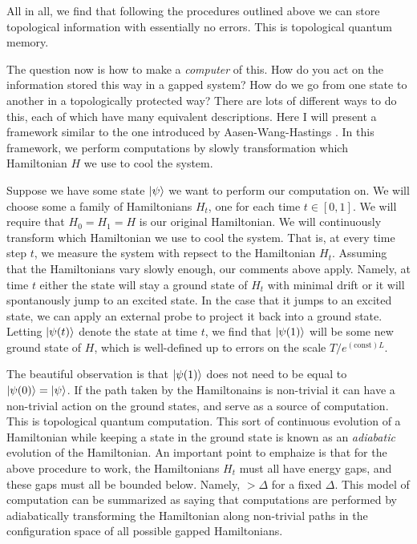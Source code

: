 All in all, we find that following the procedures outlined above we can store topological information with essentially no errors. This is topological quantum memory.

The question now is how to make a \textit{computer} of this. How do you act on the information stored this way in a gapped system? How do we go from one state to another in a topologically protected way? There are lots of different ways to do this, each of which have many equivalent descriptions. Here I will present a framework similar to the one introduced by Aasen-Wang-Hastings \cite{aasen2022adiabatic}. In this framework, we perform computations by slowly transformation which Hamiltonian $H$ we use to cool the system.

Suppose we have some state $\ket{\psi}$ we want to perform our computation on. We will choose some a family of Hamiltonians $H_t$, one for each time $t\in [0,1]$. We will require that $H_0=H_1=H$ is our original Hamiltonian. We will continuously transform which Hamiltonian we use to cool the system. That is, at every time step $t$, we measure the system with repsect to the Hamiltonian $H_t$. Assuming that the Hamiltonians vary slowly enough, our comments above apply. Namely, at time $t$ either the state will stay a ground state of $H_t$ with minimal drift or it will spontanously jump to an excited state. In the case that it jumps to an excited state, we can apply an external probe to project it back into a ground state. Letting $\ket{\psi(t)}$ denote the state at time $t$, we find that $\ket{\psi(1)}$ will be some new ground state of $H$, which is well-defined up to errors on the scale $T/e^{(\text{const})L}$.

The beautiful observation is that $\ket{\psi(1)}$ does not need to be equal to $\ket{\psi(0)}=\ket{\psi}$. If the path taken by the Hamiltonains is non-trivial it can have a non-trivial action on the ground states, and serve as a source of computation. This is topological quantum computation. This sort of continuous evolution of a Hamiltonian while keeping a state in the ground state is known as an \textit{adiabatic} evolution of the Hamiltonian. An important point to emphaize is that for the above procedure to work, the Hamiltonians $H_t$ must all have energy gaps, and these gaps must all be bounded below. Namely, $>\Delta$ for a fixed $\Delta$. This model of computation can be summarized as saying that computations are performed by adiabatically transforming the Hamiltonian along non-trivial paths in the configuration space of all possible gapped Hamiltonians.

